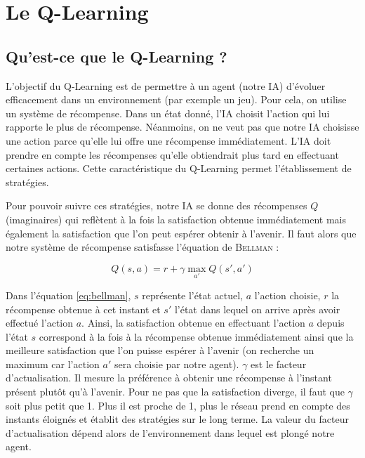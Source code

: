 \section{Le Q-Learning}

\subsection{Qu'est-ce que le Q-Learning ?}

L'objectif du Q-Learning est de permettre à un agent (notre IA) d'évoluer efficacement dans un environnement (par exemple un jeu). Pour cela, on utilise un système de
récompense. Dans un état donné, l'IA choisit l'action qui lui rapporte le plus de récompense. Néanmoins, on ne veut pas que notre IA choisisse une action parce qu'elle
lui offre une récompense immédiatement. L'IA doit prendre en compte les récompenses qu'elle obtiendrait plus tard en effectuant certaines actions. Cette 
caractéristique du Q-Learning permet l'établissement de stratégies.

Pour pouvoir suivre ces stratégies, notre IA se donne des récompenses $Q$ (imaginaires) qui reflètent à la fois la satisfaction obtenue immédiatement mais également
la satisfaction que l'on peut espérer obtenir à l'avenir. Il faut alors que notre système de récompense satisfasse l'équation de \textsc{Bellman} : 

\begin{equation}
 Q\left(s,a\right) = r + \gamma \max_{a'} Q\left(s',a'\right)
 \label{eq:bellman}
\end{equation}

Dans l'équation \ref{eq:bellman}, $s$ représente l'état actuel, $a$ l'action choisie, $r$ la récompense obtenue à cet instant et $s'$ l'état dans lequel on arrive
après avoir effectué l'action $a$. Ainsi, la satisfaction obtenue en effectuant l'action $a$ depuis l'état $s$ correspond à la fois à la récompense obtenue immédiatement
ainsi que la meilleure satisfaction que l'on puisse espérer à l'avenir (on recherche un maximum car l'action $a'$ sera choisie par notre agent). $\gamma$ est le facteur
d'actualisation. Il mesure la préférence à obtenir une récompense à l'instant présent plutôt qu'à l'avenir. Pour ne pas que la satisfaction diverge, il faut que $\gamma$
soit plus petit que 1. Plus il est proche de 1, plus le réseau prend en compte des instants éloignés et établit des stratégies sur le long terme. La valeur du facteur
d'actualisation dépend alors de l'environnement dans lequel est plongé notre agent.

